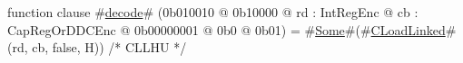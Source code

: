 function clause #\hyperref[sailMIPSzdecode]{decode}# (0b010010 @ 0b10000 @ rd : IntRegEnc @ cb : CapRegOrDDCEnc @ 0b00000001 @ 0b0 @ 0b01) = #\hyperref[sailMIPSzSome]{Some}#(#\hyperref[sailMIPSzCLoadLinked]{CLoadLinked}#(rd, cb, false, H)) /* CLLHU */
